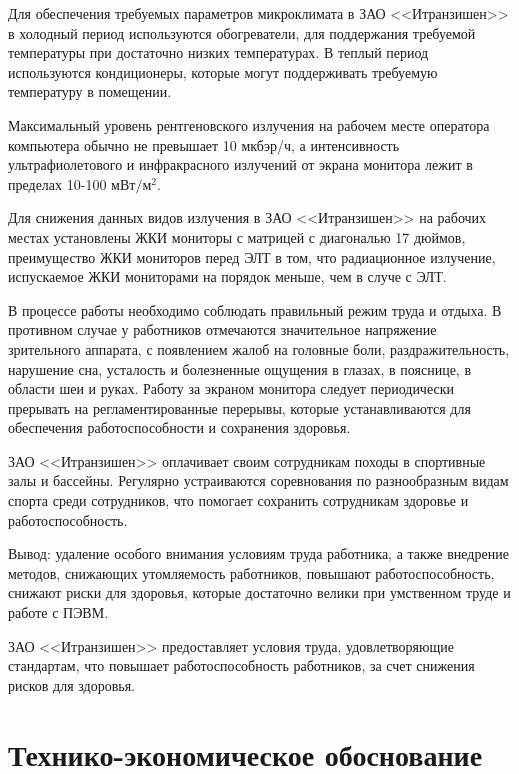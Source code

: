 \documentclass[14pt,a4paper]{reportmod}
\begin{document}
Для обеспечения требуемых параметров микроклимата в ЗАО <<Итранзишен>> в холодный период используются обогреватели, для поддержания требуемой температуры при достаточно низких температурах. В теплый период используются кондиционеры, которые могут поддерживать требуемую температуру в помещении.


Максимальный уровень рентгеновского излучения на рабочем месте оператора компьютера обычно не превышает 10 мкбэр/ч, а интенсивность ультрафиолетового и инфракрасного излучений от экрана монитора лежит в пределах 10-100 $мВт/м^{2}$.


Для снижения данных видов излучения в ЗАО <<Итранзишен>> на рабочих местах установлены ЖКИ мониторы с матрицей с диагональю 17 дюймов, преимущество ЖКИ мониторов перед ЭЛТ в том, что радиационное излучение, испускаемое ЖКИ мониторами на порядок меньше, чем в случе с ЭЛТ.


В процессе работы необходимо соблюдать правильный режим труда и отдыха. В противном случае у работников отмечаются значительное напряжение зрительного аппарата, с появлением жалоб на головные боли, раздражительность, нарушение сна, усталость и болезненные ощущения в глазах, в пояснице, в области шеи и руках. Работу за экраном монитора следует периодически прерывать на регламентированные перерывы, которые устанавливаются для обеспечения работоспособности и сохранения здоровья.


ЗАО <<Итранзишен>> оплачивает своим сотрудникам походы в спортивные залы и бассейны. Регулярно устраиваются соревнования по разнообразным видам спорта среди сотрудников, что помогает сохранить сотрудникам здоровье и работоспособность.


Вывод: удаление особого внимания условиям труда работника, а также внедрение методов, снижающих утомляемость работников, повышают работоспособность, снижают риски для здоровья, которые достаточно велики при умственном труде и работе с ПЭВМ.


ЗАО <<Итранзишен>> предоставляет условия труда, удовлетворяющие стандартам, что повышает работоспособность работников, за счет снижения рисков для здоровья.

\chapter{Технико-экономическое обоснование}
\end{document}
